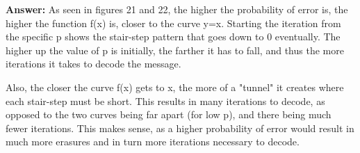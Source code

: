 \documentclass[11pt]{article}
\begin{document}
\begin{enumerate}
        
        
    {\bf Answer:}
    	As seen in figures 21 and 22, the higher the probability of error is, the higher the function f(x) is, closer to the curve y=x. Starting the iteration from the specific p shows the stair-step pattern that goes down to 0 eventually. The higher up the value of p is initially, the farther it has to fall, and thus the more iterations it takes to decode the message. 
	
	Also, the closer the curve f(x) gets to x, the more of a "tunnel" it creates where each stair-step must be short. This results in many iterations to decode, as opposed to the two curves being far apart (for low p), and there being much fewer iterations. This makes sense, as a higher probability of error would result in much more erasures and in turn more iterations necessary to decode.
	
	
    \newpage

\end{enumerate}
\end{document}
